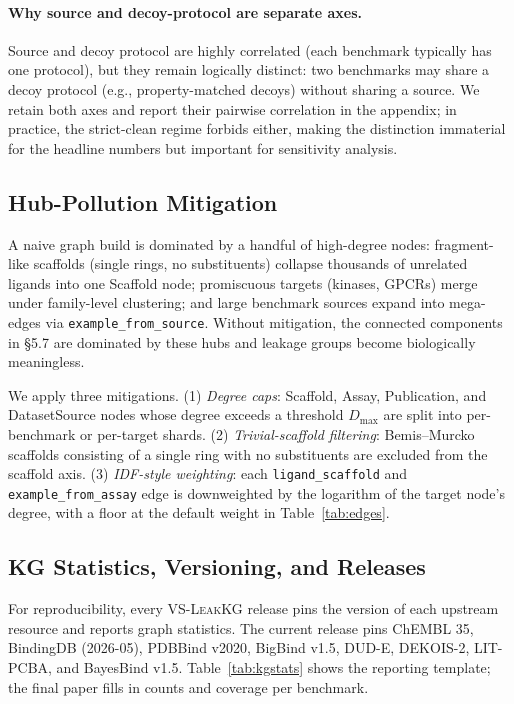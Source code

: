 \documentclass[11pt]{article}
\begin{document}
\paragraph{Why source and decoy-protocol are separate axes.}
Source and decoy protocol are highly correlated (each benchmark typically has one protocol), but they remain logically distinct: two benchmarks may share a decoy protocol (e.g., property-matched decoys) without sharing a source. We retain both axes and report their pairwise correlation in the appendix; in practice, the strict-clean regime forbids either, making the distinction immaterial for the headline numbers but important for sensitivity analysis.

\subsection{Hub-Pollution Mitigation}

A naive graph build is dominated by a handful of high-degree nodes: fragment-like scaffolds (single rings, no substituents) collapse thousands of unrelated ligands into one Scaffold node; promiscuous targets (kinases, GPCRs) merge under family-level clustering; and large benchmark sources expand into mega-edges via \texttt{example\_from\_source}. Without mitigation, the connected components in §5.7 are dominated by these hubs and leakage groups become biologically meaningless.

We apply three mitigations. (1) \emph{Degree caps}: Scaffold, Assay, Publication, and DatasetSource nodes whose degree exceeds a threshold \(D_{\max}\) are split into per-benchmark or per-target shards. (2) \emph{Trivial-scaffold filtering}: Bemis--Murcko scaffolds consisting of a single ring with no substituents are excluded from the scaffold axis. (3) \emph{IDF-style weighting}: each \texttt{ligand\_scaffold} and \texttt{example\_from\_assay} edge is downweighted by the logarithm of the target node's degree, with a floor at the default weight in Table~\ref{tab:edges}.

\subsection{KG Statistics, Versioning, and Releases}

For reproducibility, every \textsc{VS-LeakKG} release pins the version of each upstream resource and reports graph statistics. The current release pins ChEMBL 35, BindingDB (2026-05), PDBBind v2020, BigBind v1.5, DUD-E, DEKOIS-2, LIT-PCBA, and BayesBind v1.5. Table~\ref{tab:kgstats} shows the reporting template; the final paper fills in counts and coverage per benchmark.
\end{document}
